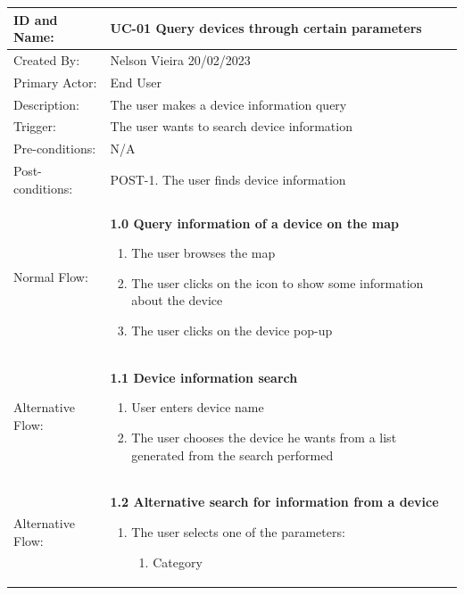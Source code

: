 \documentclass{scrreprt}
\begin{document}
\begin{table}[H]
    \centering
    \begin{adjustbox}{width=1.2\textwidth,center=\textwidth}
        \begin{tabular}{|m{4cm}|m{12cm}|}
            \hline
            ID and Name: & UC-01 Query devices through certain parameters \\
            \hline
            Created By: & Nelson Vieira 20/02/2023 \\
            \hline
            Primary Actor: & End User \\
            \hline
            Description: & The user makes a device information query \\
            \hline
            Trigger: & The user wants to search device information \\
            \hline
            Pre-conditions: & N/A \\
            \hline
            Post-conditions: & POST-1. The user finds device information \\
            \hline
            Normal Flow: & \textbf{1.0 Query information of a device on the map}
            \begin{enumerate}
                \item The user browses the map
                \item The user clicks on the icon to show some information about the device
                \item The user clicks on the device pop-up
            \end{enumerate} \\
            \hline
            Alternative Flow: & \textbf{1.1 Device information search}
            \begin{enumerate}
                \item User enters device name
                \item The user chooses the device he wants from a list generated from the search performed
            \end{enumerate} \\
            \hline
            Alternative Flow: & \textbf{1.2 Alternative search for information from a device}
            \begin{enumerate}
                \item The user selects one of the parameters:
                \begin{enumerate}
                    \item Category

\end{enumerate}
\end{enumerate}
\end{tabular}
\end{adjustbox}
\end{table}
\end{document}
